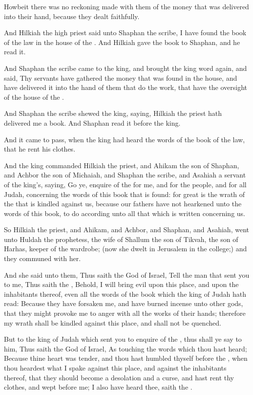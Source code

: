 \verse Howbeit there was no reckoning made with them of the money that was delivered into their hand, because they dealt faithfully.

\verse And Hilkiah the high priest said unto Shaphan the scribe, I have found the book of the law in the house of the \LORD. And Hilkiah gave the book to Shaphan, and he read it.

\verse And Shaphan the scribe came to the king, and brought the king word again, and said, Thy servants have gathered the money that was found in the house, and have delivered it into the hand of them that do the work, that have the oversight of the house of the \LORD.

\verse And Shaphan the scribe shewed the king, saying, Hilkiah the priest hath delivered me a book. And Shaphan read it before the king.

\verse And it came to pass, when the king had heard the words of the book of the law, that he rent his clothes.

\verse And the king commanded Hilkiah the priest, and Ahikam the son of Shaphan, and Achbor the son of Michaiah, and Shaphan the scribe, and Asahiah a servant of the king's, saying, \verse Go ye, enquire of the \LORD for me, and for the people, and for all Judah, concerning the words of this book that is found: for great is the wrath of the \LORD that is kindled against us, because our fathers have not hearkened unto the words of this book, to do according unto all that which is written concerning us.

\verse So Hilkiah the priest, and Ahikam, and Achbor, and Shaphan, and Asahiah, went unto Huldah the prophetess, the wife of Shallum the son of Tikvah, the son of Harhas, keeper of the wardrobe; (now she dwelt in Jerusalem in the college;) and they communed with her.

\verse And she said unto them, Thus saith the \LORD God of Israel, Tell the man that sent you to me, \verse Thus saith the \LORD, Behold, I will bring evil upon this place, and upon the inhabitants thereof, even all the words of the book which the king of Judah hath read: \verse Because they have forsaken me, and have burned incense unto other gods, that they might provoke me to anger with all the works of their hands; therefore my wrath shall be kindled against this place, and shall not be quenched.

\verse But to the king of Judah which sent you to enquire of the \LORD, thus shall ye say to him, Thus saith the \LORD God of Israel, As touching the words which thou hast heard; \verse Because thine heart was tender, and thou hast humbled thyself before the \LORD, when thou heardest what I spake against this place, and against the inhabitants thereof, that they should become a desolation and a curse, and hast rent thy clothes, and wept before me; I also have heard thee, saith the \LORD.


